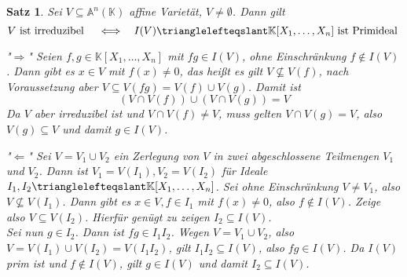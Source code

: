 \documentclass[11pt]{book}
\newtheorem{theorem}{Satz}[section]
\theoremstyle{nonumberbreak}
\newenvironment{pr}[1][]{\ifthenelse{\equal{#1}{}}{\proof}{\proof[#1]}\rm}{\endproof}
\begin{document}
\begin{spacing}{1.3}
\begin{theorem} %

Sei $V \subseteq \mathbb{A}^n(\mathbb{K})$ affine Varietät, $V \neq \emptyset$. Dann gilt
$$V \textrm{ ist irreduzibel } \quad \Longleftrightarrow \quad I(V)\trianglelefteqslant \mathbb{K}[X_1, \ldots, X_n] \textrm{ ist Primideal } $$
\begin{pr}
\begin{compactenum}
\item["$\Rightarrow$"] Seien $f,g \in \mathbb{K}[X_1, \ldots, X_n]$ mit $fg \in I(V)$, ohne Einschränkung $f \notin I(V)$. Dann gibt es $x \in V$ mit $f(x) \neq 0$, das heißt es gilt
$V \nsubseteq V(f)$, nach Voraussetzung aber $V\subseteq V(fg)=V(f)\cup V(g)$. Damit ist
$$(V\cap V(f)) \cup (V\cap V(g))=V$$
Da $V$ aber irreduzibel ist und $V \cap V(f) \neq V$, muss gelten $V \cap V(g)=V$, also $V(g)\subseteq V$ und damit $g \in I(V)$.
\item["$\Leftarrow$"] Sei $V=V_1 \cup V_2$ ein Zerlegung von $V$ in zwei abgeschlossene Teilmengen $V_1$ und $V_2$. Dann ist $V_1=V(I_1), V_2=V(I_2)$ für Ideale $I_1, I_2 \trianglelefteqslant \mathbb{K}[X_1, \ldots, X_n]$. Sei ohne Einschränkung $V\neq V_1$, also $V\nsubseteq V(I_1)$. Dann gibt es $x \in V, f \in I_1$ mit $f(x)\neq 0$, also $f \notin I(V)$. Zeige also $V\subseteq V(I_2)$. Hierfür genügt zu zeigen $I_2 \subseteq I(V)$.\\
Sei nun $g \in I_2$. Dann ist $fg\in I_1 I_2$. Wegen $V=V_1\cup V_2$, also $V=V(I_1)\cup V(I_2)=V(I_1 I_2)$, gilt $I_1 I_2 \subseteq I(V)$, also $fg \in I(V)$. Da $I(V)$ prim ist und $f \notin I(V)$, gilt $g \in I(V)$ und damit $I_2 \subseteq I(V)$.
\end{compactenum}
\end{pr}
\end{theorem}


\end{spacing}
\end{document}
